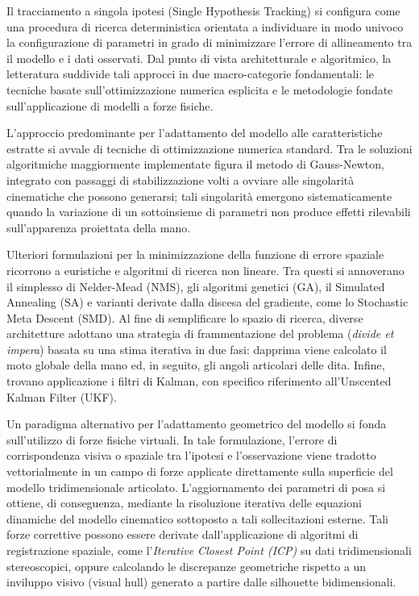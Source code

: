 Il tracciamento a singola ipotesi (Single Hypothesis Tracking) si configura come una procedura di ricerca deterministica orientata a individuare in modo univoco la configurazione di parametri in grado di minimizzare l'er\-ro\-re di allineamento tra il modello e i dati osservati.
Dal punto di vista architetturale e algoritmico, la letteratura suddivide tali approcci in due macro-categorie fondamentali:
le tecniche basate sull'ottimizzazione numerica esplicita e le metodologie fondate sull'applicazione di modelli a forze fisiche.

L'approccio predominante per l'adattamento del modello alle caratteristiche estratte si avvale di tecniche di ottimizzazione numerica standard. 
Tra le soluzioni algoritmiche maggiormente implementate figura il metodo di Gauss-Newton, integrato con passaggi di stabilizzazione volti a ovviare alle singolarità cinematiche che possono generarsi; 
tali singolarità emergono sistematicamente quando la variazione di un sottoinsieme di parametri non produce effetti rilevabili sull'apparenza proiettata della mano.

Ulteriori formulazioni per la minimizzazione della funzione di errore spaziale ricorrono a euristiche e algoritmi di ricerca non lineare.
Tra questi si annoverano il simplesso di Nelder-Mead (NMS), gli algoritmi genetici (GA), il Simulated Annealing (SA) e varianti derivate dalla discesa del gradiente, come lo Stochastic Meta Descent (SMD).
Al fine di semplificare lo spazio di ricerca, diverse architetture adottano una strategia di frammentazione del problema (\emph{divide et impera}) basata su una stima iterativa in due fasi: 
dapprima viene calcolato il moto globale della mano ed, in seguito, gli angoli articolari delle dita.
Infine, trovano applicazione i filtri di Kalman, con specifico riferimento all'Unscented Kalman Filter (UKF).

Un paradigma alternativo per l'adattamento geometrico del modello si fonda sull'utilizzo di forze fisiche virtuali. 
In tale formulazione, l'errore di corrispondenza visiva o spaziale tra l'ipotesi e l'osservazione viene tradotto vettorialmente in un campo di forze applicate direttamente sulla superficie del modello tridimensionale articolato.
L'aggiornamento dei parametri di posa si ottiene, di conseguenza, mediante la risoluzione iterativa delle equazioni dinamiche del modello cinematico sottoposto a tali sollecitazioni esterne. 
Tali forze correttive possono essere derivate dall'applicazione di algoritmi di registrazione spaziale, come l'\emph{Iterative Closest Point (ICP)} su dati tridimensionali stereoscopici, oppure calcolando le discrepanze geometriche rispetto a un inviluppo visivo (visual hull) generato a partire dalle silhouette bidimensionali. 


